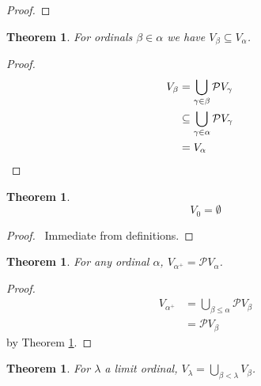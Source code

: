 \documentclass{report}
\let\qed\relax
\newtheorem{theorem}[axiom]{Theorem}
\theoremstyle{definition}
\begin{document}
    \begin{proof}
        \pf
        \qed
    \end{proof}

    \begin{theorem}
        \label{theorem:V_cumulative}
        For ordinals $\beta \in \alpha$ we have $V_\beta \subseteq V_\alpha$.
    \end{theorem}

    \begin{proof}
        \pf
        \begin{align*}
            V_\beta & = \bigcup_{\gamma \in \beta} \mathcal{P} V_\gamma \\
            & \subseteq \bigcup_{\gamma \in \alpha} \mathcal{P} V_\gamma \\
            & = V_\alpha & \qed
        \end{align*}
    \end{proof}

    \begin{theorem}
        \[ V_0 = \emptyset \]
    \end{theorem}

    \begin{proof}
        \pf\ Immediate from definitions. \qed
    \end{proof}

    \begin{theorem}
        For any ordinal $\alpha$, $V_{\alpha^+} = \mathcal{P} V_\alpha$.
    \end{theorem}

    \begin{proof}
        \pf
        \begin{align*}
            V_{\alpha^+} & = \bigcup_{\beta \leq \alpha} \mathcal{P} V_\beta \\
            & = \mathcal{P} V_\beta
        \end{align*}
        by Theorem \ref{theorem:V_cumulative}.
        \qed
    \end{proof}

    \begin{theorem}
        For $\lambda$ a limit ordinal, $V_\lambda = \bigcup_{\beta < \lambda} V_\beta$.
    \end{theorem}
\end{document}
